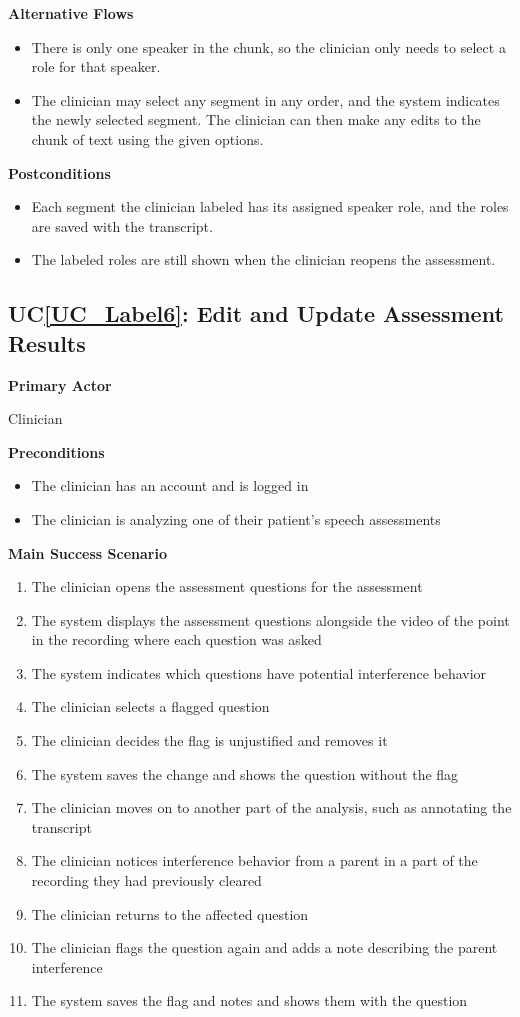 \documentclass[12pt]{article}
\newcounter{ucnum} %
\newcommand{\ucref}[1]{UC\ref{#1}}
\begin{document}
\textbf{Alternative Flows}
\begin{itemize}
  \item[10a.] There is only one speaker in the chunk, so the clinician only needs to select a role for that speaker.
  \item[11a.] The clinician may select any segment in any order, and the system indicates the newly selected segment. The clinician can then make any edits to the chunk of text using the given options.
\end{itemize}

\textbf{Postconditions}
\begin{itemize}
\item Each segment the clinician labeled has its assigned speaker role, and the roles are saved with the transcript.
\item The labeled roles are still shown when the clinician reopens the assessment.
\end{itemize}

 \label{UC_Label6}
\subsection{\ucref{UC_Label6}: Edit and Update Assessment Results}

\textbf{Primary Actor}

Clinician

\textbf{Preconditions}
\begin{itemize}
\item The clinician has an account and is logged in
\item The clinician is analyzing one of their patient’s speech assessments
\end{itemize}

\textbf{Main Success Scenario}
\begin{enumerate}
\item The clinician opens the assessment questions for the assessment
\item The system displays the assessment questions alongside the video of the point in the recording where each question was asked
\item The system indicates which questions have potential interference behavior
\item The clinician selects a flagged question
\item The clinician decides the flag is unjustified and removes it
\item The system saves the change and shows the question without the flag
\item The clinician moves on to another part of the analysis, such as annotating the transcript
\item The clinician notices interference behavior from a parent in a part of the recording they had previously cleared
\item The clinician returns to the affected question
\item The clinician flags the question again and adds a note describing the parent interference
\item The system saves the flag and notes and shows them with the question
\end{enumerate}
\end{document}
